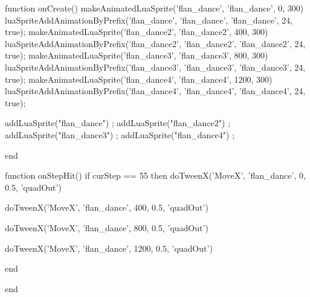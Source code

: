 function onCreate()
makeAnimatedLuaSprite('flan_dance', 'flan_dance', 0, 300)
luaSpriteAddAnimationByPrefix('flan_dance', 'flan_dance', 'flan_dance', 24, true);  
makeAnimatedLuaSprite('flan_dance2', 'flan_dance2', 400, 300)
luaSpriteAddAnimationByPrefix('flan_dance2', 'flan_dance2', 'flan_dance2', 24, true);  
makeAnimatedLuaSprite('flan_dance3', 'flan_dance3', 800, 300)
luaSpriteAddAnimationByPrefix('flan_dance3', 'flan_dance3', 'flan_dance3', 24, true);  
makeAnimatedLuaSprite('flan_dance4', 'flan_dance4', 1200, 300)
luaSpriteAddAnimationByPrefix('flan_dance4', 'flan_dance4', 'flan_dance4', 24, true);  

    addLuaSprite("flan_dance")    ;
    addLuaSprite("flan_dance2")    ;
    addLuaSprite("flan_dance3")    ;
    addLuaSprite("flan_dance4")    ;
	
end


function onStepHit()
	if curStep == 55 then
	doTweenX('MoveX', 'flan_dance', 0, 0.5, 'quadOut')
	
	doTweenX('MoveX', 'flan_dance', 400, 0.5, 'quadOut')
	
	doTweenX('MoveX', 'flan_dance', 800, 0.5, 'quadOut')
	
	doTweenX('MoveX', 'flan_dance', 1200, 0.5, 'quadOut')

		end

end
